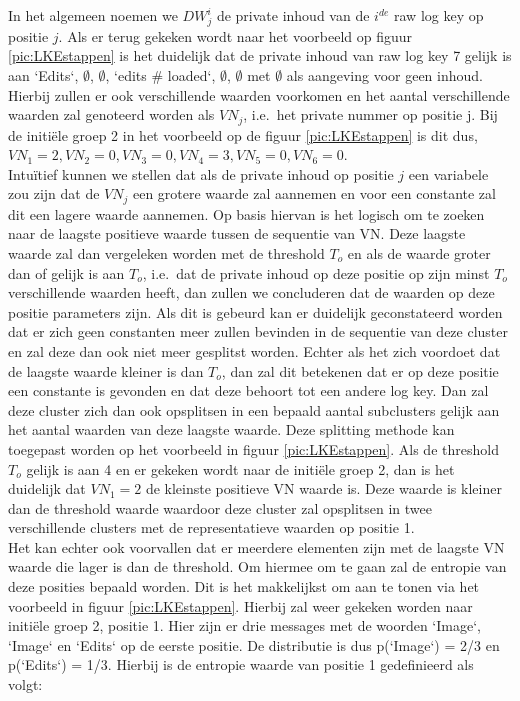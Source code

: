 \begin{itemize}
    In het algemeen noemen we \(DW_{j}^{i}\) de private inhoud van de \(i^{de}\) raw log key op positie $j$. Als er terug gekeken wordt naar het voorbeeld op figuur \ref{pic:LKEstappen} is het duidelijk dat de private inhoud van raw log key 7 gelijk is aan `Edits`, \(\emptyset\), \(\emptyset\), `edits \# loaded`, \(\emptyset\), \(\emptyset\) met \(\emptyset\) als aangeving voor geen inhoud.\\
    
   Hierbij zullen er ook verschillende waarden voorkomen en het aantal verschillende waarden zal genoteerd worden als \(VN_{j}\), i.e.\ het private nummer op positie j.
    Bij de initiële groep 2 in het voorbeeld op de figuur \ref{pic:LKEstappen} is dit dus, \(VN_{1} = 2, VN_{2} = 0, VN_{3} = 0, VN_{4} = 3, VN_{5} = 0, VN_{6} = 0\).\\
    
    Intuïtief kunnen we stellen dat als de private inhoud op positie $j$ een variabele zou zijn dat de \(VN_{j}\) een grotere waarde zal aannemen en voor een constante zal dit een lagere waarde aannemen. Op basis hiervan is het logisch om te zoeken naar de laagste positieve waarde tussen de sequentie van VN. Deze laagste waarde zal dan vergeleken worden met de threshold \(T_{o}\) en als de waarde groter dan of gelijk is aan \(T_{o}\), i.e.\ dat de private inhoud op deze positie op zijn minst \(T_{o}\) verschillende waarden heeft, dan zullen we concluderen dat de waarden op deze positie parameters zijn. Als dit is gebeurd kan er duidelijk geconstateerd worden dat er zich geen constanten meer zullen bevinden in de sequentie van deze cluster en zal deze dan ook niet meer gesplitst worden. Echter als het zich voordoet dat de laagste waarde kleiner is dan \(T_{o}\), dan zal dit betekenen dat er op deze positie een constante is gevonden en dat deze behoort tot een andere log key. Dan zal deze cluster zich dan ook opsplitsen in een bepaald aantal subclusters gelijk aan het aantal waarden van deze laagste waarde. Deze splitting methode kan toegepast worden op het voorbeeld in figuur \ref{pic:LKEstappen}. Als de threshold \(T_{o}\) gelijk is aan 4 en er gekeken wordt naar de initiële groep 2, dan is het duidelijk dat \(VN_{1} = 2\) de kleinste positieve VN waarde is. Deze waarde is kleiner dan de threshold waarde waardoor deze cluster zal opsplitsen in twee verschillende clusters met de representatieve waarden op positie 1. \\
    
    Het kan echter ook voorvallen dat er meerdere elementen zijn met de laagste VN waarde die lager is dan de threshold. Om hiermee om te gaan zal de entropie van deze posities bepaald worden. Dit is het makkelijkst om aan te tonen via het voorbeeld in figuur \ref{pic:LKEstappen}. Hierbij zal weer gekeken worden naar initiële groep 2, positie 1. Hier zijn er drie messages met de woorden `Image`, `Image` en `Edits` op de eerste positie. De distributie is dus p(`Image`) = 2/3 en p(`Edits`) = 1/3. Hierbij is de entropie waarde van positie 1 gedefinieerd als volgt:
    

\end{itemize}
